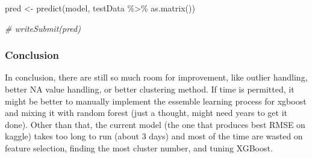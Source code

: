 \documentclass[
]{article}
\newenvironment{Shaded}{\begin{snugshade}}{\end{snugshade}}
\newcommand{\CommentTok}[1]{\textcolor[rgb]{0.56,0.35,0.01}{\textit{#1}}}
\newcommand{\FunctionTok}[1]{\textcolor[rgb]{0.00,0.00,0.00}{#1}}
\newcommand{\NormalTok}[1]{#1}
\newcommand{\OtherTok}[1]{\textcolor[rgb]{0.56,0.35,0.01}{#1}}
\newcommand{\SpecialCharTok}[1]{\textcolor[rgb]{0.00,0.00,0.00}{#1}}
\begin{document}
\begin{Shaded}
\begin{Highlighting}[]
\NormalTok{pred }\OtherTok{\textless{}{-}} \FunctionTok{predict}\NormalTok{(model, testData }\SpecialCharTok{\%\textgreater{}\%} \FunctionTok{as.matrix}\NormalTok{())}

\CommentTok{\# writeSubmit(pred)}
\end{Highlighting}
\end{Shaded}

\hypertarget{conclusion}{%
\subsubsection{Conclusion}\label{conclusion}}

In conclusion, there are still so much room for improvement, like
outlier handling, better NA value handling, or better clustering method.
If time is permitted, it might be better to manually implement the
essemble learning process for xgboost and mixing it with random forest
(just a thought, might need years to get it done). Other than that, the
current model (the one that produces best RMSE on kaggle) takes too long
to run (about 3 days) and most of the time are wasted on feature
selection, finding the most cluster number, and tuning XGBoost.
\end{document}

